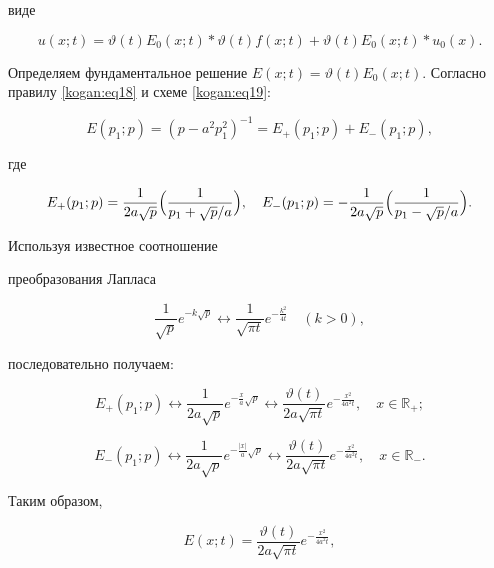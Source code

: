 виде 

\begin{equation}

\label{kogan:eq21}

u(x;t)=\vartheta (t)E_0 (x;t) \ast \vartheta (t)f(x;t)+\vartheta (t)E_0 

(x;t) \ast u_0 (x).

\end{equation}

Определяем фундаментальное решение $E(x;t)=\vartheta 

(t)E_0 (x;t)$. Согласно правилу \eqref{kogan:eq18} и схеме \eqref{kogan:eq19}:

\[

E(p_1 ;p)=(p-a^2p_1^2 )^{-1}=E_+ (p_1 ;p )+E_- (p_1 ;p),

\]

где 

$$

E_+ (p_1  ;p)=\frac{1}{2a\sqrt p }\Bigl( \frac{1}{p_1 +{\sqrt p } / a} \Bigr),

\quad 

E_- (p_1 ;p)=-\frac{1}{2a\sqrt p} \Bigl( \frac{1}{p_1 -{\sqrt p} / a}\Bigr).

$$

Используя известное соотношение 

преобразования Лапласа~\cite{kogan:bib19}

$$

\frac{1}{\sqrt p }e^{-k\sqrt p } \leftrightarrow \frac{1}{\sqrt {\pi t}}e^{-\frac{k^2}{4t}} \quad  

(k>0),

$$ 

последовательно получаем: 

$$

E_+ (p_1 ;p)\leftrightarrow  \frac{1}{2a\sqrt p }e^{-\frac{x}{a}\sqrt p }\leftrightarrow \frac{\vartheta (t)}{2a\sqrt {\pi t}  }e^{-\frac{x^2}{4a^2t}}, \quad x\in \mathbb R_+ ;

$$

$$

E_- (p_1 ;p)\leftrightarrow \frac{1}{2a\sqrt p }e^{-\frac{|x|}{a}\sqrt p }\leftrightarrow \frac{\vartheta (t)}{2a\sqrt {\pi t}  }e^{-\frac{x^2}{4a^2t}},\quad x\in \mathbb R_-.

$$ 

Таким образом, 

\begin{equation}

\label{kogan:eq22}

E(x;t)=\frac{\vartheta (t)}{2a\sqrt {\pi t}}e^{-\frac{x^2}{4a^2t}},

\end{equation}

